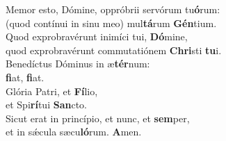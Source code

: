 \oddverse Memor esto, Dómine, oppróbrii servórum tu\textbf{ó}rum:~\*\\
\oddverse (quod contínui in sinu meo) mul\textbf{tá}rum \textbf{Gén}tium.\\
\evenverse Quod exprobravérunt inimíci tui, \textbf{Dó}mine,~\*\\
\evenverse quod exprobravérunt commutatiónem \textbf{Chri}sti \textbf{tu}i.\\
\oddverse Benedíctus Dóminus in æ\textbf{tér}num:~\*\\
\oddverse \textbf{fi}at, \textbf{fi}at.\\
\evenverse Glória Patri, et \textbf{Fí}lio,~\*\\
\evenverse et Spi\textbf{rí}tui \textbf{San}cto.\\
\oddverse Sicut erat in princípio, et nunc, et \textbf{sem}per,~\*\\
\oddverse et in sǽcula sæcu\textbf{ló}rum. \textbf{A}men.\\
